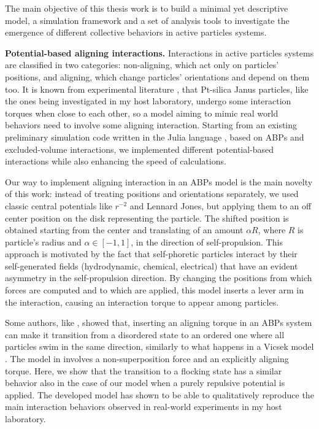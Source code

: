 \documentclass[a4paper, notitlepage]{report} %
\begin{document}
	The main objective of this thesis work is to build a minimal yet descriptive model, a simulation framework and a set of analysis tools to investigate the emergence of different collective behaviors in active particles systems.
	
	\textbf{Potential-based aligning interactions.}
	Interactions in active particles systems are classified in two categories: non-aligning, which act only on particles' positions, and aligning, which change particles' orientations and depend on them too.
	It is known from experimental literature \cite{singh_pair_2024}, that Pt-silica Janus particles, like the ones being investigated in my host laboratory, undergo some interaction torques when close to each other, so a model aiming to mimic real world behaviors need to involve some aligning interaction.
	Starting from an existing preliminary simulation code written in the Julia language \cite{JULIA WEBSITE}, based on ABPs and excluded-volume interactions, we implemented different potential-based interactions while also enhancing the speed of calculations.
	
	Our way to implement aligning interaction in an ABPs model is the main novelty of this work: instead of treating positions and orientations separately, we used classic central potentials like $r^{-2}$ and Lennard Jones, but applying them to an off center position on the disk representing the particle.
	The shifted position is obtained starting from the center and translating of an amount $\alpha R$, where $R$ is particle's radius and $\alpha \in [-1,1]$, in the direction of self-propulsion.
	This approach is motivated by the fact that self-phoretic particles interact by their self-generated fields (hydrodynamic, chemical, electrical) that have an evident asymmetry in the self-propulsion direction.
	By changing the positions from which forces are computed and to which are applied, this model inserts a lever arm in the interaction, causing an interaction torque to appear among particles.
	
	Some authors, like \citeauthor{martin-gomez_collective_2018}, showed that, inserting an aligning torque in an ABPs system can make it transition from a disordered state to an ordered one where all particles swim in the same direction, similarly to what happens in a Vicsek model \cite{vicsek_novel_1995}.
	The model in \cite{martin-gomez_collective_2018} involves a non-superposition force and an explicitly aligning torque.
	Here, we show that the transition to a flocking state has a similar behavior also in the case of our model when a purely repulsive potential is applied.
	The developed model has shown to be able to qualitatively reproduce the main interaction behaviors observed in real-world experiments in my host laboratory.
	
\end{document}
